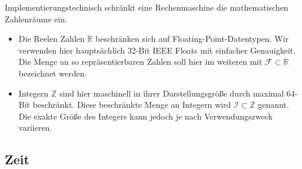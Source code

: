\label{sec:terminology}

Implementierungstechnisch schränkt eine Rechenmaschine die mathematischen Zahlenräume ein:
\begin{itemize}
\item Die Reelen Zahlen $\mathbb{R}$ beschränken sich auf Floating-Point-Datentypen. Wir verwenden hier hauptsächlich 32-Bit IEEE Floats mit einfacher Genauigkeit.
Die Menge an so repräsentierbaren Zahlen soll hier im weiteren mit $\mathcal{F} \subset \mathbb{R}$ bezeichnet werden.
\item Integern $\mathbb{Z}$ sind hier maschinell in ihrer Darstellungsgröße durch maximal 64-Bit beschränkt. Diese beschränkte Menge an Integern wird $\mathcal{I} \subset \mathbb{Z}$ genannt. Die exakte Größe des Integers kann jedoch je nach Verwendungszweck variieren.
\end{itemize}


\subsection{Zeit}
\label{sec:time}
\def\finite#1{\ooalign{\hfil$\mapstochar\mkern 3mu\mapstochar\mkern 5mu$\hfil\cr$#1$}}

